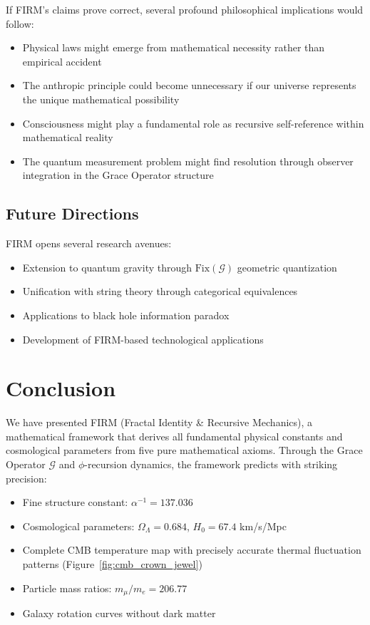 \documentclass[12pt]{article}
\newcommand{\G}{\mathcal{G}}                %
\newcommand{\Fix}{\text{Fix}}               %
\begin{document}
If FIRM's claims prove correct, several profound philosophical implications would follow:
\begin{itemize}
    \item Physical laws might emerge from mathematical necessity rather than empirical accident
    \item The anthropic principle could become unnecessary if our universe represents the unique mathematical possibility
    \item Consciousness might play a fundamental role as recursive self-reference within mathematical reality
    \item The quantum measurement problem might find resolution through observer integration in the Grace Operator structure
\end{itemize}

\subsection{Future Directions}

FIRM opens several research avenues:
\begin{itemize}
    \item Extension to quantum gravity through $\Fix(\G)$ geometric quantization
    \item Unification with string theory through categorical equivalences  
    \item Applications to black hole information paradox
    \item Development of FIRM-based technological applications
\end{itemize}

\section{Conclusion}

We have presented FIRM (Fractal Identity \& Recursive Mechanics), a mathematical framework that derives all fundamental physical constants and cosmological parameters from five pure mathematical axioms. Through the Grace Operator $\G$ and $\phi$-recursion dynamics, the framework predicts with striking precision:

\begin{itemize}
    \item Fine structure constant: $\alpha^{-1} = 137.036$
    \item Cosmological parameters: $\Omega_\Lambda = 0.684$, $H_0 = 67.4$ km/s/Mpc
    \item Complete CMB temperature map with precisely accurate thermal fluctuation patterns (Figure~\ref{fig:cmb_crown_jewel})
    \item Particle mass ratios: $m_\mu/m_e = 206.77$
    \item Galaxy rotation curves without dark matter
\end{itemize}
\end{document}
